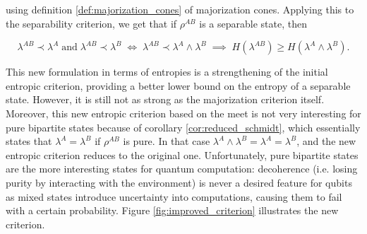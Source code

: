 \noindent using definition \ref{def:majorization_cones} of majorization cones. Applying this to the separability criterion, we get that if $\rho^{AB}$ is a separable state, then

\begin{equation}
    \lambda^{AB} \prec \lambda^A \; \text{and} \; \lambda^{AB} \prec \lambda^{B} \; \iff \; \lambda^{AB} \prec \lambda^A \wedge \lambda^B \; \implies \; H(\lambda^{AB}) \geq H(\lambda^A \wedge \lambda^B).
\end{equation}

This new formulation in terms of entropies is a strengthening of the initial entropic criterion, providing a better lower bound on the entropy of a separable state. However, it is still not as strong as the majorization criterion itself. Moreover, this new entropic criterion based on the meet is not very interesting for pure bipartite states because of corollary \ref{cor:reduced_schmidt}, which essentially states that $\lambda^A = \lambda^B$ if $\rho^{AB}$ is pure. In that case $\lambda^A \wedge \lambda^B = \lambda^A = \lambda^B$, and the new entropic criterion reduces to the original one. Unfortunately, pure bipartite states are the more interesting states for quantum computation: decoherence (i.e. losing purity by interacting with the environment) is never a desired feature for qubits as mixed states introduce uncertainty into computations, causing them to fail with a certain probability. Figure \ref{fig:improved_criterion} illustrates the new criterion.

